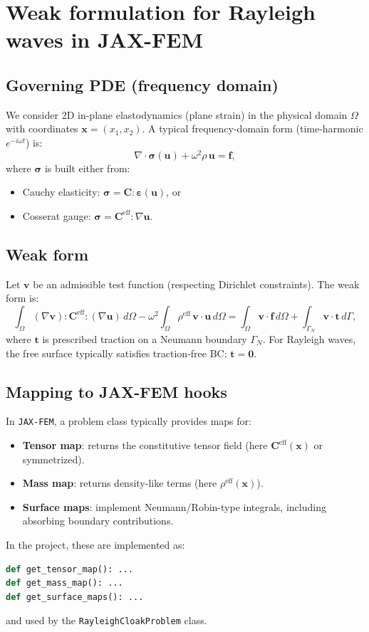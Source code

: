 \documentclass[11pt,a4paper]{report}
\begin{document}
\chapter{Weak formulation for Rayleigh waves in JAX-FEM}
\section{Governing PDE (frequency domain)}
We consider 2D in-plane elastodynamics (plane strain) in the physical domain $\Omega$ with coordinates $\bm x=(x_1,x_2)$.
A typical frequency-domain form (time-harmonic $e^{-i\omega t}$) is:
\begin{equation}
\nabla \cdot \bm\sigma(\bm u) + \omega^2 \rho\, \bm u = \bm f,
\end{equation}
where $\bm\sigma$ is built either from:
\begin{itemize}
\item Cauchy elasticity: $\bm\sigma = \bm C : \bm\varepsilon(\bm u)$, or
\item Cosserat gauge: $\bm\sigma = \bm C^{\mathrm{eff}} : \nabla \bm u$.
\end{itemize}

\section{Weak form}
Let $\bm v$ be an admissible test function (respecting Dirichlet constraints).
The weak form is:
\begin{equation}
\int_{\Omega} (\nabla \bm v) : \bm C^{\mathrm{eff}} : (\nabla \bm u)\, d\Omega
- \omega^2 \int_{\Omega} \rho^{\mathrm{eff}}\, \bm v \cdot \bm u\, d\Omega
= \int_{\Omega} \bm v\cdot \bm f\, d\Omega + \int_{\Gamma_N} \bm v \cdot \bm t\, d\Gamma,
\label{eq:weak}
\end{equation}
where $\bm t$ is prescribed traction on a Neumann boundary $\Gamma_N$.
For Rayleigh waves, the free surface typically satisfies traction-free BC:
$\bm t=\bm 0$.

\section{Mapping to JAX-FEM hooks}
In \texttt{JAX-FEM}, a problem class typically provides maps for:
\begin{itemize}
\item \textbf{Tensor map}: returns the constitutive tensor field (here $\bm C^{\mathrm{eff}}(\bm x)$ or symmetrized).
\item \textbf{Mass map}: returns density-like terms (here $\rho^{\mathrm{eff}}(\bm x)$).
\item \textbf{Surface maps}: implement Neumann/Robin-type integrals, including absorbing boundary contributions.
\end{itemize}
In the project, these are implemented as:
\begin{lstlisting}[language=Python]
def get_tensor_map(): ...
def get_mass_map(): ...
def get_surface_maps(): ...
\end{lstlisting}
and used by the \texttt{RayleighCloakProblem} class.
\end{document}
